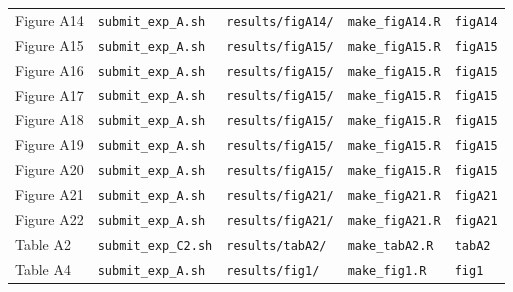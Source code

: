\begin{tabular}{lllll}
Figure A14 & \texttt{submit\_exp\_A.sh} & \texttt{results/figA14/} & \texttt{make\_figA14.R} & \texttt{figA14} \\
Figure A15 & \texttt{submit\_exp\_A.sh} & \texttt{results/figA15/} & \texttt{make\_figA15.R} & \texttt{figA15} \\
Figure A16 & \texttt{submit\_exp\_A.sh} & \texttt{results/figA15/} & \texttt{make\_figA15.R} & \texttt{figA15} \\
Figure A17 & \texttt{submit\_exp\_A.sh} & \texttt{results/figA15/} & \texttt{make\_figA15.R} & \texttt{figA15} \\
Figure A18 & \texttt{submit\_exp\_A.sh} & \texttt{results/figA15/} & \texttt{make\_figA15.R} & \texttt{figA15} \\
Figure A19 & \texttt{submit\_exp\_A.sh} & \texttt{results/figA15/} & \texttt{make\_figA15.R} & \texttt{figA15} \\
Figure A20 & \texttt{submit\_exp\_A.sh} & \texttt{results/figA15/} & \texttt{make\_figA15.R} & \texttt{figA15} \\
Figure A21 & \texttt{submit\_exp\_A.sh} & \texttt{results/figA21/} & \texttt{make\_figA21.R} & \texttt{figA21} \\
Figure A22 & \texttt{submit\_exp\_A.sh} & \texttt{results/figA21/} & \texttt{make\_figA21.R} & \texttt{figA21} \\
Table A2 & \texttt{submit\_exp\_C2.sh} & \texttt{results/tabA2/} & \texttt{make\_tabA2.R} & \texttt{tabA2} \\
Table A4 & \texttt{submit\_exp\_A.sh} & \texttt{results/fig1/} & \texttt{make\_fig1.R} & \texttt{fig1} \\
\bottomrule
\end{tabular}
